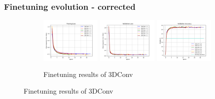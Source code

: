 \documentclass{beamer}
\begin{document}
\begin{frame}
    \frametitle{Finetuning evolution - corrected}
    \begin{figure}[htbp]
        \centering    
        \begin{subfigure}[b]{\textwidth}
            \centering
            \includegraphics[width=0.32\textwidth]{./entities/finetuned_new/baseline/train_losses.png}
            \includegraphics[width=0.32\textwidth]{./entities/finetuned_new/baseline/val_losses.png}
            \includegraphics[width=0.32\textwidth]{./entities/finetuned_new/baseline/val_accs.png}
            \caption{Finetuning results of 3DConv}
        \end{subfigure}
        \hfill
    

\end{figure}
\end{frame}
\end{document}
